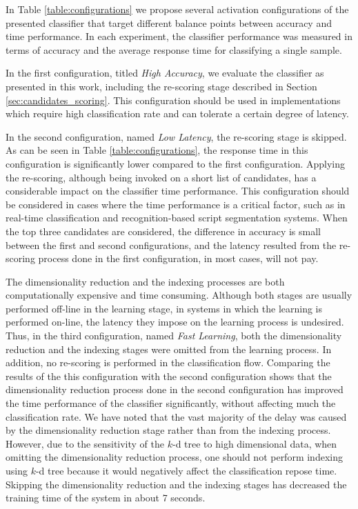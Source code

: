 In Table \ref{table:configurations} we propose several activation configurations of the presented classifier that target different balance points between accuracy and time performance.
In each experiment, the classifier performance was measured in terms of accuracy and the average response time for classifying a single sample.

In the first configuration, titled \emph{High Accuracy}, we evaluate the classifier as presented in this work, including the re-scoring stage described in Section \ref{sec:candidates_scoring}.
This configuration should be used in implementations which require high classification rate and can tolerate a certain degree of latency.

In the second configuration, named \emph{Low Latency}, the re-scoring stage is skipped.
As can be seen in Table \ref{table:configurations}, the response time in this configuration is significantly lower compared to the first configuration.
Applying the re-scoring, although being invoked on a short list of candidates, has a considerable impact on the classifier time performance. 
This configuration should be considered in cases where the time performance is a critical factor, such as in real-time classification and recognition-based script segmentation systems.
When the top three candidates are considered, the difference in accuracy is small between the first and second configurations, and the latency resulted from the re-scoring process done in the first configuration, in most cases, will not pay. 

The dimensionality reduction and the indexing processes are both computationally expensive and time consuming. 
Although both stages are usually performed off-line in the learning stage, in systems in which the learning is performed on-line, the latency they impose on the learning process is undesired.
Thus, in the third configuration, named \emph{Fast Learning}, both the dimensionality reduction and the indexing stages were omitted from the learning process.
In addition, no re-scoring is performed in the classification flow.
Comparing the results of the this configuration with the second configuration shows that the dimensionality reduction process done in the second configuration has improved the time performance of the classifier significantly, without affecting much the classification rate.
We have noted that the vast majority of the delay was caused by the dimensionality reduction stage rather than from the indexing process.
However, due to the sensitivity of the $k$-d tree to high dimensional data, when omitting the dimensionality reduction process, one should not perform indexing using $k$-d tree because it would negatively affect the classification repose time.
Skipping the dimensionality reduction and the indexing stages has decreased the training time of the system in about 7 seconds.

